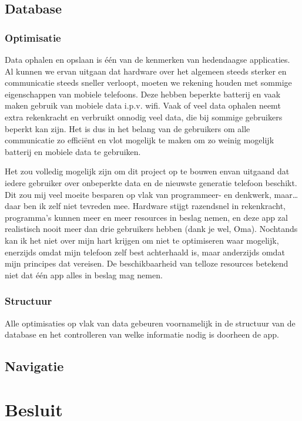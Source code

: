 \documentclass{report}
\begin{document}
\section{Database}
\subsection{Optimisatie}
Data ophalen en opslaan is één van de kenmerken van hedendaagse applicaties.
Al kunnen we ervan uitgaan dat hardware over het algemeen steeds sterker en communicatie steeds sneller verloopt, moeten we rekening houden met sommige eigenschappen van mobiele telefoons.
Deze hebben beperkte batterij en vaak maken gebruik van mobiele data i.p.v. wifi.
Vaak of veel data ophalen neemt extra rekenkracht en verbruikt onnodig veel data, die bij sommige gebruikers beperkt kan zijn.
Het is dus in het belang van de gebruikers om alle communicatie zo efficiënt en vlot mogelijk te maken om zo weinig mogelijk batterij en mobiele data te gebruiken.


Het zou volledig mogelijk zijn om dit project op te bouwen envan uitgaand dat iedere gebruiker over onbeperkte data en de nieuwste generatie telefoon beschikt.
Dit zou mij veel moeite besparen op vlak van programmeer- en denkwerk, maar\ldots daar ben ik zelf niet tevreden mee.
Hardware stijgt razendsnel in rekenkracht, programma's kunnen meer en meer resources in beslag nemen, en deze app zal realistisch nooit meer dan drie gebruikers hebben (dank je wel, Oma).
Nochtands kan ik het niet over mijn hart krijgen om niet te optimiseren waar mogelijk, enerzijds omdat mijn telefoon zelf best achterhaald is, maar anderzijds omdat mijn principes dat vereisen.
De beschikbaarheid van telloze resources betekend niet dat één app alles in beslag mag nemen.



\subsection{Structuur}
Alle optimisaties op vlak van data gebeuren voornamelijk in de structuur van de database en het controlleren van welke informatie nodig is doorheen de app.

\section{Navigatie}


\chapter{Besluit}
\end{document}
